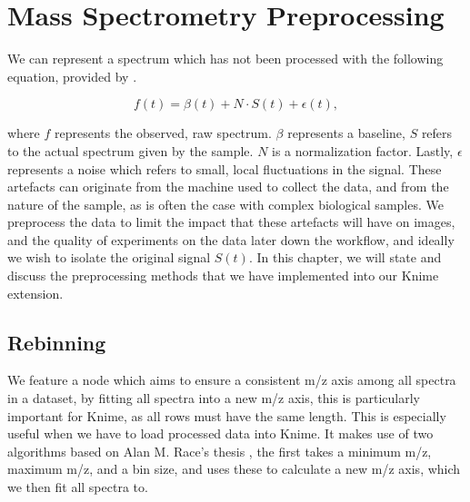 \documentclass[11pt,openany]{book}
\begin{document}
\chapter{Mass Spectrometry Preprocessing}
We can represent a spectrum which has not been processed with the following equation, provided by \cite{alan_race_phd_thesis}.

\begin{equation}
    f(t) = \beta(t) + N \cdot S(t) + \epsilon(t),
    \label{equation:mass_spectrum_equation}
\end{equation}

where $f$ represents the observed, raw spectrum. $\beta$ represents a baseline, $S$ refers to the actual spectrum given by the sample. $N$ is a normalization factor. Lastly, $\epsilon$ represents a noise which refers to small, local fluctuations in the signal. These artefacts can originate from the machine used to collect the data, and from the nature of the sample, as is often the case with complex biological samples. We preprocess the data to limit the impact that these artefacts will have on images, and the quality of experiments on the data later down the workflow, and ideally we wish to isolate the original signal $S(t)$. In this chapter, we will state and discuss the preprocessing methods that we have implemented into our Knime extension. 

\section{Rebinning}
We feature a node which aims to ensure a consistent m/z axis among all spectra in a dataset, by fitting all spectra into a new m/z axis, this is particularly important for Knime, as all rows must have the same length. This is especially useful when we have to load processed data into Knime. It makes use of two algorithms based on Alan M. Race's thesis \cite{alan_race_phd_thesis}, the first takes a minimum m/z, maximum m/z, and a bin size, and uses these to calculate a new m/z axis, which we then fit all spectra to.
\end{document}
